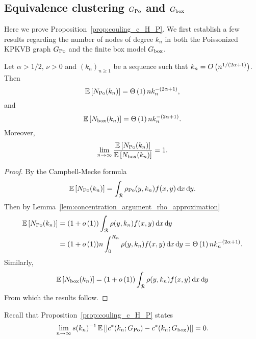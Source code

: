 \subsection{Equivalence clustering $G_{\text{Po}}$ and $G_{\text{box}}$}\label{ssec:coupling_HP_ast_P}


Here we prove Proposition~\ref{prop:couling_c_H_P}. We first establish a few results regarding the number of nodes of degree $k_n$ in both the Poissonized KPKVB graph $G_{\text{Po}}$ and the finite box model $G_{\text{box}}$.

\begin{lemma}\label{lem:N_k_HP_P}
Let $\alpha > 1/2$, $\nu > 0$ and $(k_n)_{n\ge 1}$ be a sequence such that $k_n = O\left(n^{1/(2\alpha + 1)}\right)$. Then
\begin{equation} \label{eq:n_k_Hyp}
	\mathbb{E}\left[N_{{\mathrm{Po}}}(k_n)\right] = \Theta\left(1\right) n k_n^{-(2\alpha + 1)},
\end{equation}
and
\begin{equation} \label{eq:n_k_Po}
	\mathbb{E}\left[N_{\text{box}}(k_n)\right] = \Theta\left(1\right) n k_n^{-(2\alpha + 1)}.
\end{equation}
Moreover,
\begin{equation}\label{eq:equivalence_N_HP_P}
	\lim_{n \to \infty} \frac{\mathbb{E}\left[N_{{\mathrm{Po}}}(k_n)\right]}{\mathbb{E}\left[N_{\text{box}}(k_n)\right]} = 1.
\end{equation}
\end{lemma}

\begin{proof}
By the Campbell-Mecke formula
\[
	\mathbb{E}\left[N_{{\mathrm{Po}}}(k_n)\right] = \int_{{\mathcal R}} \rho_{{\mathrm{Po}}}(y,k_n) f(x,y) \operatorname{\mathrm{d}\hspace{-2pt}} x \operatorname{\mathrm{d}\hspace{-2pt}} y. 
\]
Then by Lemma~\ref{lem:concentration_argument_rho_approximation} 
\begin{align*}
	\mathbb{E}\left[N_{{\mathrm{Po}}}(k_n)\right] &= (1 + o\left(1\right))\int_{{\mathcal R}} \rho(y,k_n) f(x,y) \operatorname{\mathrm{d}\hspace{-2pt}} x \operatorname{\mathrm{d}\hspace{-2pt}} y\\
	&= (1 + o\left(1\right)) n \int_{0}^{R_n} \rho(y,k_n) f(x,y) \operatorname{\mathrm{d}\hspace{-2pt}} x \operatorname{\mathrm{d}\hspace{-2pt}} y = \Theta\left(1\right)n k_n^{-(2\alpha + 1)}.
\end{align*}
Similarly,
\[
	\mathbb{E}\left[N_{\text{box}}(k_n)\right] = (1 + o\left(1\right))\int_{{\mathcal R}} \rho(y,k_n) f(x,y) \operatorname{\mathrm{d}\hspace{-2pt}} x \operatorname{\mathrm{d}\hspace{-2pt}} y
\]
From which the results follow.
\end{proof}

Recall that Proposition~\ref{prop:couling_c_H_P} states
\[
	\lim_{n \to \infty} s(k_n)^{-1} \, \mathbb{E}\left[\left|c^\ast(k_n; G_{\text{Po}}) - c^\ast(k_n;G_{\text{box}})\right|\right] = 0.
\]

